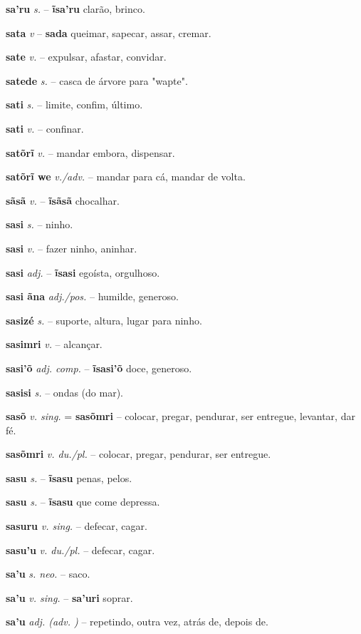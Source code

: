 \textbf{sa'ru} \textit{s.} -- \textbf{ĩsa'ru} clarão, brinco.

\textbf{sata} \textit{v} -- \textbf{sada} queimar, sapecar, assar, cremar.

\textbf{sate} \textit{v.} -- expulsar, afastar, convidar.

\textbf{satede} \textit{s.} -- casca de árvore para "wapte".

\textbf{sati} \textit{s.} -- limite, confim, último.

\textbf{sati} \textit{v.} -- confinar.

\textbf{satõrĩ} \textit{v.} -- mandar embora, dispensar.

\textbf{satõrĩ we} \textit{v./adv.} -- mandar para cá, mandar de volta.

\textbf{sãsã} \textit{v.} -- \textbf{ĩsãsã} chocalhar.

\textbf{sasi} \textit{s.} -- ninho.

\textbf{sasi} \textit{v.} -- fazer ninho, aninhar.

\textbf{sasi} \textit{adj.} -- \textbf{ĩsasi} egoísta, orgulhoso.

\textbf{sasi ãna} \textit{adj./pos.} -- humilde, generoso.

\textbf{sasizé} \textit{s.} -- suporte, altura, lugar para ninho.

\textbf{sasimri} \textit{v.} -- alcançar.

\textbf{sasi'õ} \textit{adj. comp.} -- \textbf{ĩsasi'õ} doce, generoso.

\textbf{sasisi} \textit{s.} -- ondas (do mar).

\textbf{sasõ} \textit{v. sing.} = \textbf{sasõmri} -- colocar, pregar, pendurar, ser entregue, levantar, dar fé.

\textbf{sasõmri} \textit{v. du./pl.} -- colocar, pregar, pendurar, ser entregue.

\textbf{sasu} \textit{s.} -- \textbf{ĩsasu} penas, pelos.

\textbf{sasu} \textit{s.} -- \textbf{ĩsasu} que come depressa.

\textbf{sasuru} \textit{v. sing.} -- defecar, cagar.

\textbf{sasu'u} \textit{v. du./pl.} -- defecar, cagar.

\textbf{sa'u} \textit{s. neo.} -- saco.

\textbf{sa'u} \textit{v. sing.} -- \textbf{sa'uri} soprar.

\textbf{sa'u} \textit{adj. (adv. )} -- repetindo, outra vez, atrás de, depois de.

